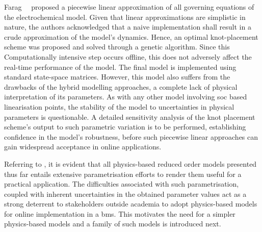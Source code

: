 Farag~\etal{}~\cite{Farag2017}  proposed  a  piecewise linear  approximation  of
all  governing  equations  of  the  electrochemical  model.  Given  that  linear
approximations are simplistic  in nature, the authors acknowledged  that a naive
implementation shall  result in a  crude approximation of the  model's dynamics.
Hence,  an optimal  knot-placement  scheme  was proposed  and  solved through  a
genetic  algorithm. Since  this Computationally  intensive step  occurs offline,
this does not adversely affect the real-time performance of the model. The final
model is  implemented using standard  state-space matrices. However,  this model
also suffers  from the  drawbacks of  the hybrid  modelling approaches,  \ie{} a
complete lack  of physical interpretation of  its parameters. As with  any other
model involving \gls{soc} based linearisation points, the stability of the model
to uncertainties in physical parameters  is questionable. A detailed sensitivity
analysis of the  knot placement scheme's output to such  parametric variation is
to  be performed,  establishing  confidence in  the  model's robustness,  before
such  piecewise  linear approaches  can  gain  widespread acceptance  in  online
applications.





Referring  to   ,  it   is  evident   that  all
physics-based  reduced  order  models   presented  thus  far  entails  extensive
parametrisation efforts   to render  them useful for a  practical application.
The  difficulties associated  with such  parametrisation, coupled  with inherent
uncertainties  in  the obtained  parameter  values  act  as a  strong  deterrent
to  stakeholders  outside academia  to  adopt  physics-based models  for  online
implementation  in  a   \gls{bms}.  This  motivates  the  need   for  a  simpler
physics-based models and a family of such models is introduced next.


